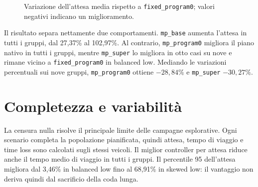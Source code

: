\documentclass[12pt,a4paper,oneside]{report}
\numberwithin{equation}{chapter}
\begin{document}
\begin{figure}[htbp]
    \centering
    \caption{Variazione dell'attesa media rispetto a
    \texttt{fixed\_program0}; valori negativi indicano un miglioramento.}
    \label{fig:bologna-wait-bars}
\end{figure}

Il risultato separa nettamente due comportamenti. \texttt{mp\_base} aumenta
l'attesa in tutti i gruppi, dal 27,37\% al 102,97\%. Al contrario,
\texttt{mp\_program0} migliora il piano nativo in tutti i gruppi, mentre
\texttt{mp\_super} lo migliora in otto casi su nove e rimane vicino a
\texttt{fixed\_program0}
in balanced low. Mediando le variazioni percentuali sui nove gruppi,
\texttt{mp\_program0} ottiene $-28{,}84\%$ e \texttt{mp\_super}
$-30{,}27\%$.

\section{Completezza e variabilità}

La censura nulla risolve il principale limite delle campagne esplorative.
Ogni scenario completa la popolazione pianificata, quindi attesa, tempo di
viaggio e time loss sono calcolati sugli stessi veicoli. Il miglior controller
per attesa riduce anche il tempo medio di viaggio in tutti i gruppi. Il
percentile 95 dell'attesa migliora dal 3,46\% in balanced low fino al 68,91\%
in skewed low: il vantaggio non deriva quindi dal sacrificio della coda lunga.
\end{document}
